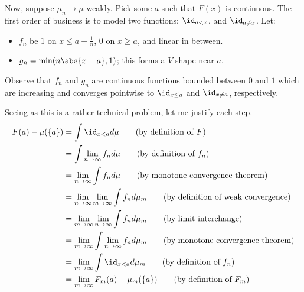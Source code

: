 \documentclass[11pt, headheight=30pt]{scrartcl}
\begin{document}
Now, suppose $\mu_n\to \mu$ weakly. Pick some $a$ such that $F(x)$
is continuous. The first order of business
is to model two functions: $\id_{a < x}$, and $\id_{a \neq x}$.
Let:
\begin{itemize}
    \item $f_n$ be $1$ on $x\leq a - \frac1n$, $0$ on $x\geq a$, and linear in between.
    \item $g_n = \min(n\abs{x - a}, 1)$; this forms a $V$-shape near $a$.
\end{itemize}
Observe that $f_n$ and $g_n$ are continuous functions bounded between $0$ and $1$
which are increasing and converges pointwise to $\id_{x \leq a}$
and $\id_{x\neq a}$, respectively.

Seeing as this is a rather technical problem, let me justify each step.
\begin{align*}
    F(a) - \mu(\{a\}) &= \int \id_{x < a} d\mu \tag{by definition of $F$} \\
    &= \int \lim_{n\to \infty} f_n d\mu \tag{by definition of $f_n$} \\
    &= \lim_{n\to \infty} \int f_n d\mu \tag{by monotone convergence theorem} \\
    &= \lim_{n\to \infty} \lim_{m\to \infty} \int f_n d\mu_m \tag{by definition of weak convergence} \\
    &= \lim_{m\to \infty} \lim_{n\to \infty} \int f_n d\mu_m \tag{by limit interchange} \\
    &= \lim_{m\to \infty} \int \lim_{n\to \infty} f_n d\mu_m \tag{by monotone convergence theorem} \\
    &= \lim_{m\to \infty} \int \id_{x < a} d\mu_m \tag{by definition of $f_n$} \\
    &= \lim_{m\to \infty} F_m(a) - \mu_m(\{a\}) \tag{by definition of $F_m$} \\
\end{align*}
\end{document}
